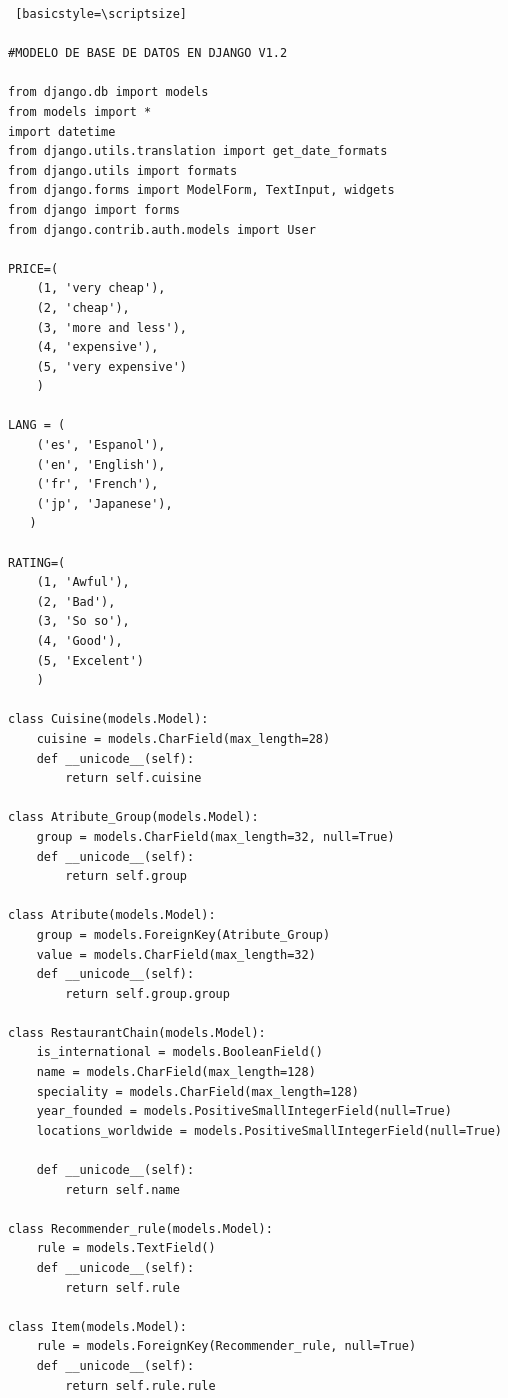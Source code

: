 \documentclass[12pt,letterpaper,oneside] {memoir}
\begin{document}
\lstset{language=python}
\begin{lstlisting} [basicstyle=\scriptsize]	

#MODELO DE BASE DE DATOS EN DJANGO V1.2

from django.db import models
from models import *
import datetime
from django.utils.translation import get_date_formats
from django.utils import formats
from django.forms import ModelForm, TextInput, widgets
from django import forms
from django.contrib.auth.models import User

PRICE=(
    (1, 'very cheap'),
    (2, 'cheap'),
    (3, 'more and less'),
    (4, 'expensive'),
    (5, 'very expensive')
    )

LANG = (
    ('es', 'Espanol'),
    ('en', 'English'),
    ('fr', 'French'),
    ('jp', 'Japanese'),
   )
   
RATING=(
    (1, 'Awful'),
    (2, 'Bad'),
    (3, 'So so'),
    (4, 'Good'),
    (5, 'Excelent')
    )

class Cuisine(models.Model):
    cuisine = models.CharField(max_length=28)
    def __unicode__(self):
        return self.cuisine

class Atribute_Group(models.Model):
    group = models.CharField(max_length=32, null=True)
    def __unicode__(self):
        return self.group

class Atribute(models.Model):
    group = models.ForeignKey(Atribute_Group) 
    value = models.CharField(max_length=32)
    def __unicode__(self):
        return self.group.group
    
class RestaurantChain(models.Model):
    is_international = models.BooleanField()
    name = models.CharField(max_length=128)
    speciality = models.CharField(max_length=128)
    year_founded = models.PositiveSmallIntegerField(null=True)
    locations_worldwide = models.PositiveSmallIntegerField(null=True)
    
    def __unicode__(self):
        return self.name
    
class Recommender_rule(models.Model):
    rule = models.TextField()
    def __unicode__(self):
        return self.rule
    
class Item(models.Model): 
    rule = models.ForeignKey(Recommender_rule, null=True)
    def __unicode__(self):
        return self.rule.rule


\end{lstlisting}
\end{document}
